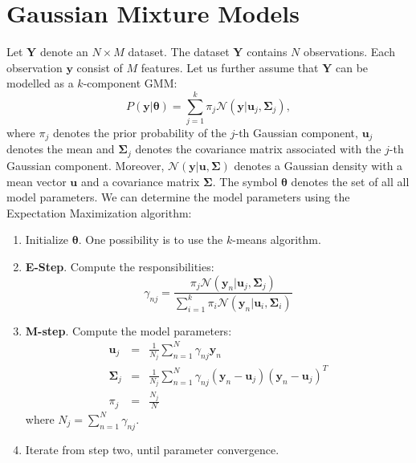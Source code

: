 \documentclass{article}
\begin{document}
\section{Gaussian Mixture Models}
\label{sec:GMM}
Let $\mathbf{Y}$ denote an $N\times M$ dataset. The dataset $\mathbf{Y}$ contains $N$ observations. Each observation $\mathbf{y}$ consist of $M$ features. Let us further assume 
that $\mathbf{Y}$ can be modelled as a $k$-component GMM:
\begin{equation}
P(\mathbf{y}|\boldsymbol{\theta})=\sum_{j=1}^k \pi_j \mathcal{N}(\mathbf{y}|\mathbf{u}_j,\mathbf{\Sigma}_j),
\end{equation}
where $\pi_j$ denotes the prior probability of the $j$-th Gaussian component, $\mathbf{u}_j$ denotes the mean and $\mathbf{\Sigma}_j$ denotes the covariance matrix associated with the $j$-th Gaussian component. Moreover,
$\mathcal{N}(\mathbf{y}|\mathbf{u},\mathbf{\Sigma})$ denotes a Gaussian density with a mean vector $\mathbf{u}$ and a covariance matrix $\mathbf{\Sigma}$. The symbol $\boldsymbol{\theta}$ denotes the set of all all 
model parameters.
We can determine the model parameters using the Expectation Maximization algorithm:
\begin{enumerate}
 \item Initialize $\boldsymbol{\theta}$. One possibility is to use the $k$-means algorithm.
 \item \textbf{E-Step}. Compute the responsibilities:
 \begin{equation}
  \gamma_{nj} = \frac{\pi_j\mathcal{N}(\mathbf{y}_n|\mathbf{u}_j,\mathbf{\Sigma}_j)}{\sum_{i=1}^{k}\pi_i\mathcal{N}(\mathbf{y}_n|\mathbf{u}_i,\mathbf{\Sigma}_i)}
 \end{equation}
 \item \textbf{M-step}. Compute the model parameters:
 \begin{eqnarray}
  \mathbf{u}_j &=& \frac{1}{N_j} \sum_{n=1}^{N} \gamma_{nj}\mathbf{y}_n\\
  \mathbf{\Sigma}_j &=& \frac{1}{N_j} \sum_{n=1}^{N} \gamma_{nj} (\mathbf{y}_n-\mathbf{u}_j)(\mathbf{y}_n-\mathbf{u}_j)^T\\
  \pi_j &=& \frac{N_j}{N}
 \end{eqnarray}
 where $N_j = \sum_{n=1}^N \gamma_{nj}$.
 \item Iterate from step two, until parameter convergence.
\end{enumerate}
\end{document}
